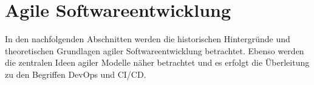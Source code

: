\section{Agile Softwareentwicklung}
\label{Agile Softwareentwicklung}
In den nachfolgenden Abschnitten werden die historischen Hintergründe und theoretischen Grundlagen agiler Softwareentwicklung betrachtet. Ebenso werden die zentralen Ideen agiler Modelle näher betrachtet und es erfolgt die Überleitung zu den Begriffen \gls{DevOps} und \acrshort{CI}/\acrshort{CD}.